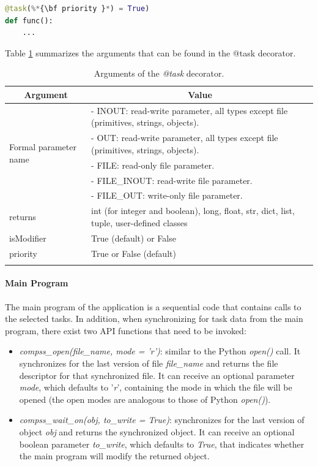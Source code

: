 \begin{lstlisting}[language=python]
@task(%*{\bf priority }*) = True)
def func():
    ...
\end{lstlisting}

Table \ref{tab:task_decorator_arguments} summarizes the arguments that can be found in the @task decorator.

\begin{longtable}{| p{} | p{} |}
\hline
\multicolumn{1}{|c|}{{\bf Argument }}    &  \multicolumn{1}{c|}{{\bf Value }}\\
\hline
\multirow{5}{*}{Formal parameter name}  &  - INOUT: read-write parameter, all types except file (primitives, strings, objects). \\
& - OUT: read-write parameter, all types except file (primitives, strings, objects). \\
& - FILE: read-only file parameter. \\
& - FILE\_INOUT: read-write file parameter. \\
& - FILE\_OUT: write-only file parameter. \\
\hline
returns & int (for integer and boolean), long, float, str, dict, list, tuple, user-defined classes \\
\hline
isModifier &  True (default) or False \\
\hline
priority  & True or False (default) \\
\hline
\caption{Arguments of the {\it @task} decorator.}
\label{tab:task_decorator_arguments}
\end{longtable}


\paragraph{Main Program}
The main program of the application is a sequential code that contains calls to the selected tasks. 
In addition, when synchronizing for task data from the main program, 
there exist two API functions that need to be invoked:

\begin{itemize}
 \item {\it compss\_open(file\_name, mode = 'r')}: similar to the Python {\it open()} call. It synchronizes
       for the last version of file {\it file\_name} and returns the file descriptor for that synchronized
       file. It can receive an optional parameter {\it mode}, which defaults to '{\it r}', containing the
       mode in which the file will be opened (the open modes are analogous to those of
       Python {\it open()}).
 \item {\it compss\_wait\_on(obj, to\_write = True)}: synchronizes for the last version of object {\it obj}
       and returns the synchronized object. It can receive an optional boolean parameter
       {\it to\_write}, which defaults to {\it True}, that indicates whether the main program will modify the
       returned object.
\end{itemize}

